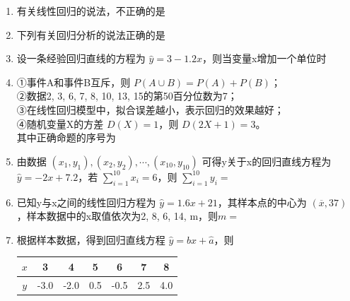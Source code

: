 \begin{enumerate}
\item 有关线性回归的说法，不正确的是

\item 下列有关回归分析的说法正确的是

\item 设一条经验回归直线的方程为 $\hat{y}=3-1.2x$，则当变量x增加一个单位时

\item ①事件A和事件B互斥，则 $P(A\cup B)=P(A)+P(B)$；\\
②数据2, 3, 6, 7, 8, 10, 13, 15的第50百分位数为7；\\
③在线性回归模型中，拟合误差越小，表示回归的效果越好；\\
④随机变量X的方差 $D(X)=1$，则 $D(2X+1)=3$。\\
其中正确命题的序号为

\item 由数据 $(x_{1},y_{1}), (x_{2},y_{2}), \cdots, (x_{10},y_{10})$ 可得y关于x的回归直线方程为 $\hat{y}=-2x+7.2$，若 $\sum_{i=1}^{10}x_{i}=6$，则 $\sum_{i=1}^{10}y_{i}=$

\item 已知y与x之间的线性回归方程为 $\hat{y}=1.6x+21$，其样本点的中心为 $(\overline{x},37)$，样本数据中的x取值依次为2, 8, 6, 14, m，则$m=$

\item 根据样本数据，得到回归直线方程 $\hat{y}=\hat{b}x+\hat{a}$，则
\begin{center}
\begin{tabular}{|c|c|c|c|c|c|c|}
\hline
$x$ & 3 & 4 & 5 & 6 & 7 & 8 \\
\hline
$y$ & -3.0 & -2.0 & 0.5 & -0.5 & 2.5 & 4.0 \\
\hline
\end{tabular}
\end{center}


\end{enumerate}
